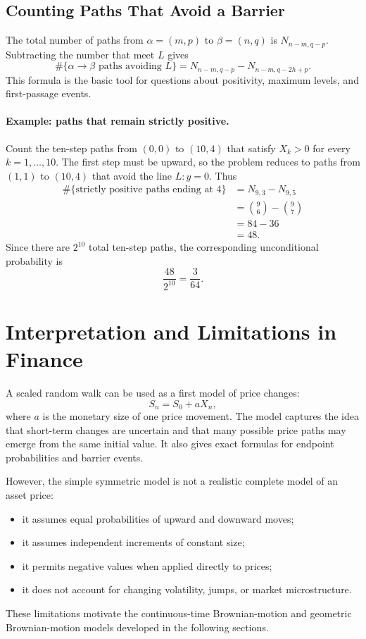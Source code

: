 \documentclass[12pt,openany]{book}
\theoremstyle{definition}
\theoremstyle{remark}
\begin{document}
\subsection{Counting Paths That Avoid a Barrier}

The total number of paths from \(\alpha=(m,p)\) to \(\beta=(n,q)\) is
\(N_{n-m,q-p}\). Subtracting the number that meet \(L\) gives
\[
\boxed{
\#\{\alpha\to\beta\text{ paths avoiding }L\}
=N_{n-m,q-p}-N_{n-m,q-2h+p}
}.
\]
This formula is the basic tool for questions about positivity, maximum
levels, and first-passage events.

\paragraph{Example: paths that remain strictly positive.}
Count the ten-step paths from \((0,0)\) to \((10,4)\) that satisfy
\(X_k>0\) for every \(k=1,\ldots,10\). The first step must be upward, so the
problem reduces to paths from \((1,1)\) to \((10,4)\) that avoid the line
\(L:y=0\). Thus
\[
\begin{aligned}
\#\{\text{strictly positive paths ending at }4\}
&=N_{9,3}-N_{9,5}\\
&=\binom{9}{6}-\binom{9}{7}\\
&=84-36\\
&=48.
\end{aligned}
\]
Since there are \(2^{10}\) total ten-step paths, the corresponding
unconditional probability is
\[
\frac{48}{2^{10}}=\frac{3}{64}.
\]

\section{Interpretation and Limitations in Finance}

A scaled random walk can be used as a first model of price changes:
\[
S_n=S_0+aX_n,
\]
where \(a\) is the monetary size of one price movement. The model captures
the idea that short-term changes are uncertain and that many possible price
paths may emerge from the same initial value. It also gives exact formulas
for endpoint probabilities and barrier events.

However, the simple symmetric model is not a realistic complete model of an
asset price:
\begin{itemize}
    \item it assumes equal probabilities of upward and downward moves;
    \item it assumes independent increments of constant size;
    \item it permits negative values when applied directly to prices;
    \item it does not account for changing volatility, jumps, or market
    microstructure.
\end{itemize}
These limitations motivate the continuous-time Brownian-motion and geometric
Brownian-motion models developed in the following sections.
\end{document}
